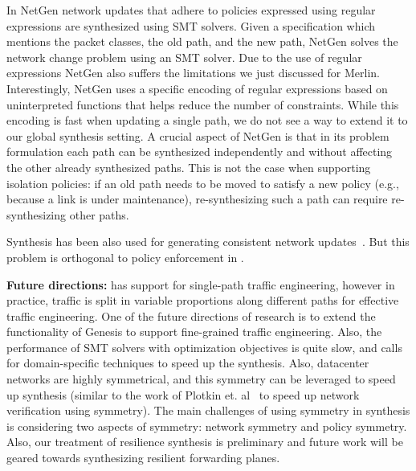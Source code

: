 In NetGen network updates that adhere to policies expressed using
regular expressions are synthesized using SMT solvers.  Given a
specification which mentions the packet classes, the old path, and the
new path, NetGen solves the network change problem using an SMT solver.
Due to the use of regular expressions NetGen also suffers the
limitations we just discussed for Merlin.  Interestingly, NetGen uses
a specific encoding of regular expressions based on uninterpreted
functions that helps reduce the number of constraints. While this
encoding is fast when updating a single path, we do not see a way to
extend it to our global synthesis setting.  A crucial aspect of NetGen
is that in its problem formulation each path can be synthesized
independently and without affecting the other already synthesized
paths.  This is not the case when supporting isolation policies: if an
old path needs to be moved to satisfy a new policy (e.g., because a
link is under maintenance), re-synthesizing such a path can require
re-synthesizing other paths. 

Synthesis has been also used for generating consistent network
updates~\cite{updates, customconsistency}. But this problem is orthogonal to 
policy enforcement in \Name.


\noindent
{\bf Future directions:}
\Name has support for single-path traffic engineering, however in
practice, traffic is split in variable proportions along different 
paths for effective traffic engineering. One of the future 
directions of research is to extend the functionality of Genesis
to support fine-grained traffic engineering. Also, the performance
of SMT solvers with optimization objectives is quite slow, and calls for 
domain-specific techniques to speed up the synthesis. Also, datacenter
networks are highly symmetrical, and this symmetry can be leveraged
to speed up synthesis (similar to the work of Plotkin et. al~\cite{symmetry} to
speed up network verification using symmetry). The main challenges of
using symmetry in synthesis is considering two aspects of symmetry: network
symmetry and policy symmetry. Also, our treatment of resilience synthesis
is preliminary and future work will be geared towards synthesizing resilient
forwarding planes. 
 
